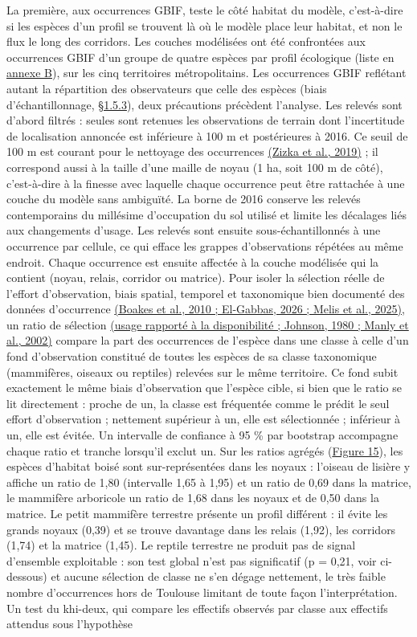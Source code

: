 \documentclass[a4paper,11pt]{report}
\begin{document}
La première, aux occurrences GBIF, teste le côté habitat du modèle, c'est-à-dire si les espèces d'un profil se trouvent là où le modèle place leur habitat, et non le flux le long des corridors. Les couches modélisées ont été confrontées aux occurrences GBIF d'un groupe de quatre espèces par profil écologique (liste en \hyperref[annexe:B]{annexe B}), sur les cinq territoires métropolitains. Les occurrences GBIF reflétant autant la répartition des observateurs que celle des espèces (biais d'échantillonnage, \hyperref[sec:1.5.3]{§1.5.3}), deux précautions précèdent l'analyse. Les relevés sont d'abord filtrés : seules sont retenues les observations de terrain dont l'incertitude de localisation annoncée est inférieure à 100 m et postérieures à 2016. Ce seuil de 100 m est courant pour le nettoyage des occurrences \hyperref[sec:bibliographie]{(Zizka et al., 2019)} ; il correspond aussi à la taille d'une maille de noyau (1 ha, soit 100 m de côté), c'est-à-dire à la finesse avec laquelle chaque occurrence peut être rattachée à une couche du modèle sans ambiguïté. La borne de 2016 conserve les relevés contemporains du millésime d'occupation du sol utilisé et limite les décalages liés aux changements d'usage. Les relevés sont ensuite sous-échantillonnés à une occurrence par cellule, ce qui efface les grappes d'observations répétées au même endroit. Chaque occurrence est ensuite affectée à la couche modélisée qui la contient (noyau, relais, corridor ou matrice). Pour isoler la sélection réelle de l'effort d'observation, biais spatial, temporel et taxonomique bien documenté des données d'occurrence \hyperref[sec:bibliographie]{(Boakes et al., 2010 ; El-Gabbas, 2026 ; Melis et al., 2025)}, un ratio de sélection \hyperref[sec:bibliographie]{(usage rapporté à la disponibilité ; Johnson, 1980 ; Manly et al., 2002)} compare la part des occurrences de l'espèce dans une classe à celle d'un fond d'observation constitué de toutes les espèces de sa classe taxonomique (mammifères, oiseaux ou reptiles) relevées sur le même territoire. Ce fond subit exactement le même biais d'observation que l'espèce cible, si bien que le ratio se lit directement : proche de un, la classe est fréquentée comme le prédit le seul effort d'observation ; nettement supérieur à un, elle est sélectionnée ; inférieur à un, elle est évitée. Un intervalle de confiance à 95 \% par bootstrap accompagne chaque ratio et tranche lorsqu'il exclut un. Sur les ratios agrégés (\hyperref[fig:15]{Figure 15}), les espèces d'habitat boisé sont sur-représentées dans les noyaux : l'oiseau de lisière y affiche un ratio de 1,80 (intervalle 1,65 à 1,95) et un ratio de 0,69 dans la matrice, le mammifère arboricole un ratio de 1,68 dans les noyaux et de 0,50 dans la matrice. Le petit mammifère terrestre présente un profil différent : il évite les grands noyaux (0,39) et se trouve davantage dans les relais (1,92), les corridors (1,74) et la matrice (1,45). Le reptile terrestre ne produit pas de signal d'ensemble exploitable : son test global n'est pas significatif (p = 0,21, voir ci-dessous) et aucune sélection de classe ne s'en dégage nettement, le très faible nombre d'occurrences hors de Toulouse limitant de toute façon l'interprétation. Un test du khi-deux, qui compare les effectifs observés par classe aux effectifs attendus sous l'hypothèse 
\end{document}
